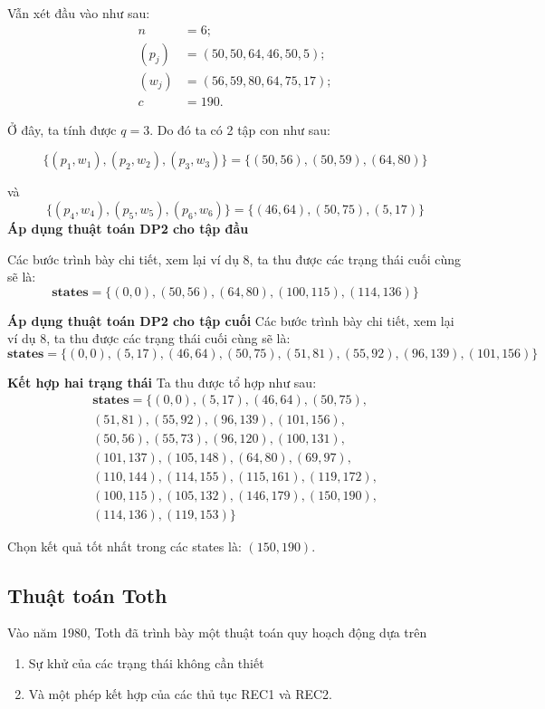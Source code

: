 \begin{example}
Vẫn xét đầu vào như sau:
\[
    \begin{split}
        n &= 6;\\
        (p_j) &= (50, 50, 64, 46, 50, 5);\\
        (w_j) &= (56, 59, 80, 64, 75, 17);\\
        c & = 190.
    \end{split}
\]

Ở đây, ta tính được $q=3$. Do đó ta có 2 tập con như sau:


\[
\{(p_1, w_1), (p_2, w_2), (p_3, w_3)\} = \{
    (50, 56), (50, 59), (64, 80)
\}
\]

và
\[
\{(p_4, w_4), (p_5, w_5), (p_6, w_6)\} = \{
    (46, 64), (50, 75), (5, 17)
\}
\]
\textbf{Áp dụng thuật toán DP2 cho tập đầu}

Các bước trình bày chi tiết, xem lại ví dụ 8, ta thu được các trạng thái cuối cùng sẽ là:
\[
\textbf{states} = \{
    (0,0),(50,56),(64,80),(100,115),(114,136)
\}
\]

\textbf{Áp dụng thuật toán DP2 cho tập cuối}
Các bước trình bày chi tiết, xem lại ví dụ 8, ta thu được các trạng thái cuối cùng sẽ là:
\[
\textbf{states} = \{
    (0,0),(5,17),(46,64),(50,75),(51,81),(55,92),(96,139),(101,156)
\}
\]

\textbf{Kết hợp hai trạng thái}
Ta thu được tổ hợp như sau:
\begin{align*}
    \textbf{states} = \{
    (0,0),(5,17),(46,64),(50,75),\\
    (51,81),(55,92),(96,139),(101,156),\\
    (50,56),(55,73),(96,120),(100,131),\\
    (101,137),(105,148),(64,80),(69,97),\\
    (110,144),(114,155),(115,161),(119,172),\\
    (100,115),(105,132),(146,179),(150,190),\\
    (114,136),(119,153)
\}
\end{align*}

Chọn kết quả tốt nhất trong các states là: $(150, 190)$.
\end{example}


\subsection{Thuật toán Toth}

Vào năm 1980, Toth đã trình bày một thuật toán quy hoạch động dựa trên 
\begin{enumerate}[label=(\alph*)]
    \item Sự khử của các trạng thái không cần thiết
    \item Và một phép kết hợp của các thủ tục REC1 và REC2.
\end{enumerate}


